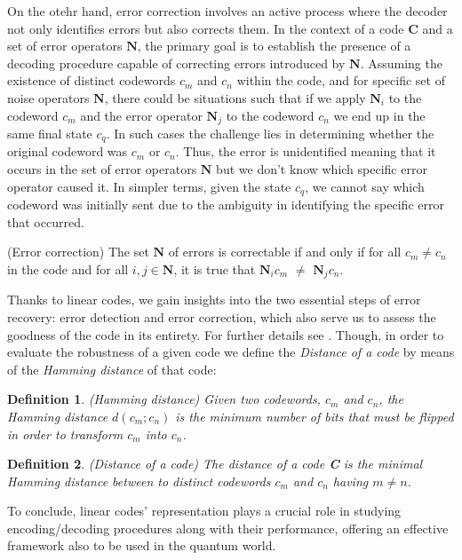 \documentclass{Configuration_Files/PoliMi3i_thesis}
\newtheorem{definition}{Definition}[chapter]
\begin{document}
On the otehr hand, error correction involves an active process where the decoder not only identifies errors but also corrects them. 
In the context of a code $\textbf{C}$ and a set of error operators $\textbf{N}$, the primary goal is to establish the presence of a decoding procedure capable of correcting errors introduced by $\textbf{N}$. 
Assuming the existence of distinct codewords $c_m$ and $c_n$ within the code, and for specific set of noise operators $\textbf{N}$, there could be situations such that if we apply $\textbf{N}_i$ to the codeword $c_m$ and the error operator $\textbf{N}_j$ to the codeword $c_n$ we end up in the same final state $c_q$. In such cases the challenge lies in determining whether the original codeword was $c_m$ or $c_n$. Thus, the error is unidentified meaning that it occurs in the set of error operators $\textbf{N}$ but we don't know which specific error operator caused it. In simpler terms, given the state $c_q$, we cannot say which codeword was initially sent due to the ambiguity in identifying the specific error that occurred.

\begin{theorem}(Error correction)
	The set $\textbf{N}$ of errors is correctable if and only if for all $c_m \neq c_n$ in the code and for all $i, j \in \textbf{N}$, it is true that $\textbf{N}_ic_m$ $\neq$ $\textbf{N}_jc_n$. 
\end{theorem} 

Thanks to linear codes, we gain insights into the two essential steps of error recovery: error detection and error correction, which also serve us to assess the goodness of the code in its entirety. For further details see \cite{Kas19}. Though, in order to evaluate the robustness of a given code we define the {\it Distance of a code} by means of the {\it Hamming distance} of that code:


\begin{definition}(Hamming distance)
	Given two codewords, $c_m$ and $c_n$, the Hamming distance $d(c_m; c_n)$ is the minimum number of bits that must be flipped in order to transform $c_m$ into $c_n$.
\end{definition}


\begin{definition}(Distance of a code)
	The distance of a code {\bf C } is the minimal Hamming distance between to distinct codewords $c_m$ and $c_n$ having $m \neq n$.
\end{definition}
	
To conclude, linear codes' representation plays a crucial role in studying encoding/decoding procedures along with their performance, offering an effective framework also to be used in the quantum world.
\end{document}
